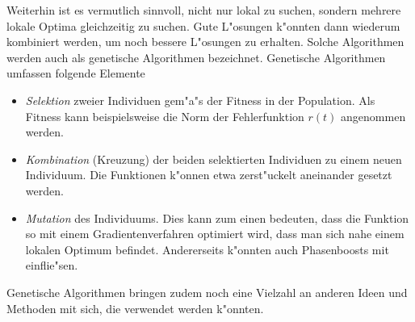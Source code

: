 \documentclass[a4paper]{scrartcl}
\begin{document}
Weiterhin ist es vermutlich sinnvoll, nicht nur lokal zu suchen, sondern mehrere lokale Optima gleichzeitig zu suchen. Gute L"osungen k"onnten dann wiederum kombiniert werden, um noch bessere L"osungen zu erhalten. Solche Algorithmen werden auch als genetische Algorithmen bezeichnet. Genetische Algorithmen umfassen folgende Elemente
\begin{itemize}
  \item {\em Selektion} zweier Individuen gem"a"s der Fitness in der Population. Als Fitness kann beispielsweise die Norm der Fehlerfunktion $r(t)$ angenommen werden.  
  \item {\em Kombination} (Kreuzung) der beiden selektierten Individuen zu einem neuen Individuum. Die Funktionen k"onnen etwa zerst"uckelt aneinander gesetzt werden.
  \item {\em Mutation} des Individuums. Dies kann zum einen bedeuten, dass die Funktion so mit einem Gradientenverfahren optimiert wird, dass man sich nahe einem lokalen Optimum befindet. Andererseits k"onnten auch Phasenboosts mit einflie"sen. 
\end{itemize}
Genetische Algorithmen bringen zudem noch eine Vielzahl an anderen Ideen und Methoden mit sich, die verwendet werden k"onnten. 
\end{document}
